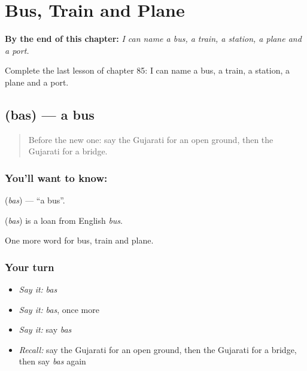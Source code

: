 
\chapter{Bus, Train and Plane}
\label{ch:gu-bus-train-and-plane}

\begin{chapteropening}
\textbf{By the end of this chapter:} \emph{I can name a bus, a train, a station, a plane and a port.}

Complete the last lesson of chapter 85: I can name a bus, a train, a station, a plane and a port.
\end{chapteropening}

\section[\texorpdfstring{\gu{બસ} (bas)}{બસ (bas)}]{ (bas) — a bus}

\label{lesson:GU-C85-bus}



\begin{quote}
Before the new one: say the Gujarati for an open ground, then the Gujarati for a bridge.
\end{quote}

\subsection*{You'll want to know: }
\textbf{} (\emph{bas}) — \textquotedblleft{}a bus\textquotedblright{}.

\begin{cousinweb}
\textbf{} (\emph{bas}) is a loan from English \emph{bus}.
\end{cousinweb}

\begin{grammarlens}[title={What you've built}]
One more word for bus, train and plane.
\end{grammarlens}

\subsection*{Your turn}
\begin{itemize}
\raggedright
  \item \emph{Say it:} \emph{bas}
  \item \emph{Say it:} \emph{bas}, once more
  \item \emph{Say it:} say \emph{bas}
  \item \emph{Recall:} say the Gujarati for an open ground, then the Gujarati for a bridge, then say \emph{bas} again
\end{itemize}


